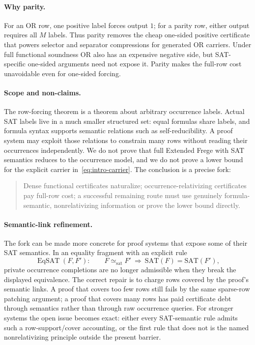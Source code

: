 \documentclass[11pt]{article}
\theoremstyle{definition}
\newcommand{\SAT}{\mathrm{SAT}}
\newcommand{\EqSAT}{\operatorname{EqSAT}}
\begin{document}
\paragraph{Why parity.}
For an OR row, one positive label forces output $1$; for a parity row, either output requires all $M$ labels. Thus parity removes the cheap one-sided positive certificate that powers selector and separator compressions for generated OR carriers. Under full functional soundness OR also has an expensive negative side, but SAT-specific one-sided arguments need not expose it. Parity makes the full-row cost unavoidable even for one-sided forcing.

\paragraph{Scope and non-claims.}
The row-forcing theorem is a theorem about arbitrary occurrence labels. Actual SAT labels live in a much smaller structured set: equal formulas share labels, and formula syntax supports semantic relations such as self-reducibility. A proof system may exploit those relations to constrain many rows without reading their occurrences independently. We do not prove that full Extended Frege with SAT semantics reduces to the occurrence model, and we do not prove a lower bound for the explicit carrier in~\eqref{eq:intro-carrier}. The conclusion is a precise fork:
\begin{quote}
Dense functional certificates naturalize; occurrence-relativizing certificates pay full-row cost; a successful remaining route must use genuinely formula-semantic, nonrelativizing information or prove the lower bound directly.
\end{quote}

\paragraph{Semantic-link refinement.}
The fork can be made more concrete for proof systems that expose some of their SAT semantics. In an equality fragment with an explicit rule
\[
  \EqSAT(F,F'):\qquad F\simeq_{\mathrm{sat}} F'\ \Longrightarrow\ \SAT(F)=\SAT(F'),
\]
private occurrence completions are no longer admissible when they break the displayed equivalence. The correct repair is to charge rows covered by the proof's semantic links. A proof that covers too few rows still fails by the same sparse-row patching argument; a proof that covers many rows has paid certificate debt through semantics rather than through raw occurrence queries. For stronger systems the open issue becomes exact: either every SAT-semantic rule admits such a row-support/cover accounting, or the first rule that does not is the named nonrelativizing principle outside the present barrier.
\end{document}
